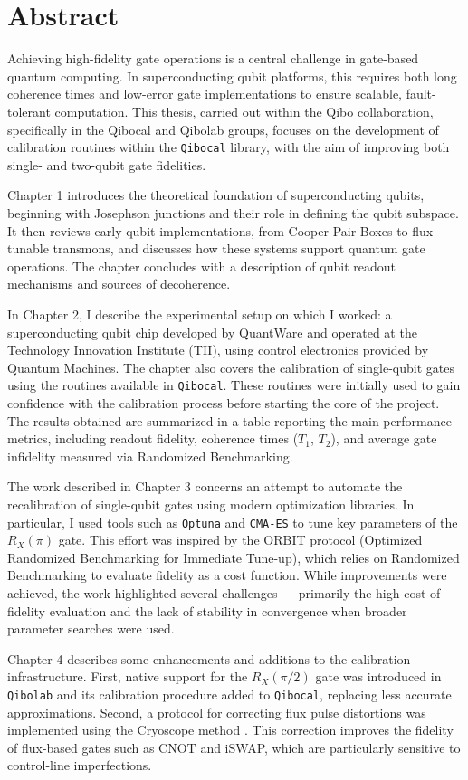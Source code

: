 \chapter{Abstract}
Achieving high-fidelity gate operations is a central challenge in gate-based quantum computing. In superconducting qubit platforms, this requires both long coherence times and low-error gate implementations to ensure scalable, fault-tolerant computation.
This thesis, carried out within the Qibo collaboration, specifically in the Qibocal and Qibolab groups, focuses on the development of calibration routines within the \texttt{Qibocal} library, with the aim of improving both single- and two-qubit gate fidelities.

Chapter 1 introduces the theoretical foundation of superconducting qubits, beginning with Josephson junctions and their role in defining the qubit subspace. 
It then reviews early qubit implementations, from Cooper Pair Boxes to flux-tunable transmons, and discusses how these systems support quantum gate operations. 
The chapter concludes with a description of qubit readout mechanisms and sources of decoherence.

In Chapter 2, I describe the experimental setup on which I worked: a superconducting qubit chip developed by QuantWare and operated at the Technology Innovation Institute (TII), using control electronics provided by Quantum Machines. 
The chapter also covers the calibration of single-qubit gates using the routines available in \texttt{Qibocal}. 
These routines were initially used to gain confidence with the calibration process before starting the core of the project. 
The results obtained are summarized in a table reporting the main performance metrics, including readout fidelity, coherence times ($T_1$, $T_2$), and average gate infidelity measured via Randomized Benchmarking.

The work described in Chapter 3 concerns an attempt to automate the recalibration of single-qubit gates using modern optimization libraries. 
In particular, I used tools such as \texttt{Optuna} and \texttt{CMA-ES} to tune key parameters of the $R_X(\pi)$ gate. 
This effort was inspired by the ORBIT protocol (Optimized Randomized Benchmarking for Immediate Tune-up), which relies on Randomized Benchmarking to evaluate fidelity as a cost function. 
While improvements were achieved, the work highlighted several challenges — primarily the high cost of fidelity evaluation and the lack of stability in convergence when broader parameter searches were used.

Chapter 4 describes some enhancements and additions to the calibration infrastructure. 
First, native support for the $R_X(\pi/2)$ gate was introduced in \texttt{Qibolab} and its calibration procedure added to \texttt{Qibocal}, replacing less accurate approximations. 
Second, a protocol for correcting flux pulse distortions was implemented using the Cryoscope method \cite{rol_time-domain_2020}. 
This correction improves the fidelity of flux-based gates such as CNOT and iSWAP, which are particularly sensitive to control-line imperfections.

